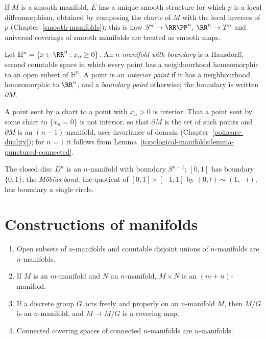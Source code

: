 If $M$ is a smooth manifold, $E$ has a unique smooth structure for which $p$ is a local diffeomorphism, obtained by composing the charts of $M$ with the local inverses of $p$
(Chapter~\ref{smooth-manifolds}); this is how $S^n \to \RR\PP^n$, $\RR^n \to T^n$ and universal coverings of smooth manifolds are treated as smooth maps.

\begin{definition}\label{topological-manifolds:definition-boundary}
Let $\mathbb{H}^n = \{x \in \RR^n : x_n \geq 0\}$. An \emph{$n$-manifold with boundary} is a Hausdorff, second countable space in which every point has a neighbourhood homeomorphic to an open subset of $\mathbb{H}^n$. A point is an
\emph{interior point} if it has a neighbourhood homeomorphic to $\RR^n$, and a \emph{boundary point} otherwise; the boundary is written $\partial M$.
\end{definition}

A point sent by a chart to a point with $x_n > 0$ is interior. That a point sent by some chart to $\{x_n = 0\}$ is not interior, so that $\partial M$ is the set of such points and $\partial M$ is an $(n-1)$-manifold, uses invariance
of domain (Chapter~\ref{poincare-duality}); for $n = 1$ it follows from Lemma~\ref{topological-manifolds:lemma-punctured-connected}.

\begin{example}\label{topological-manifolds:example-boundary}
The closed disc $D^n$ is an $n$-manifold with boundary $S^{n-1}$; $[0, 1]$ has boundary $\{0, 1\}$; the \emph{M\"obius band}, the quotient of $[0, 1] \times [-1, 1]$ by $(0, t) \sim (1, -t)$, has boundary a single circle.
\end{example}

\section{Constructions of manifolds}\label{topological-manifolds:section-constructions}

\begin{proposition}\label{topological-manifolds:proposition-constructions}
\begin{enumerate}
\item Open subsets of $n$-manifolds and countable disjoint unions of $n$-manifolds are $n$-manifolds.
\item If $M$ is an $m$-manifold and $N$ an $n$-manifold, $M \times N$ is an $(m + n)$-manifold.
\item If a discrete group $G$ acts freely and properly on an $n$-manifold $M$, then $M/G$ is an $n$-manifold, and $M \to M/G$ is a covering map.
\item Connected covering spaces of connected $n$-manifolds are $n$-manifolds.
\end{enumerate}
\end{proposition}


